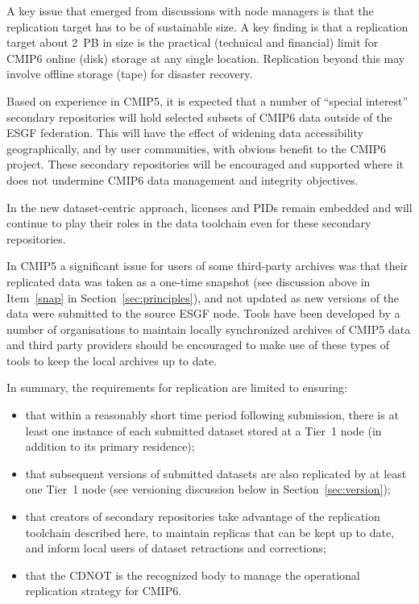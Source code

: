 \documentclass[gmd,manuscript]{copernicus}
\begin{document}
A key issue that emerged from discussions with node managers is that
the replication target has to be of sustainable size. A key finding is
that a replication target about 2~PB in size is the practical
(technical and financial) limit for CMIP6 online (disk) storage at any
single location. Replication beyond this may involve offline storage
(tape) for disaster recovery.

Based on experience in CMIP5, it is expected that a number of
``special interest'' secondary repositories will hold selected subsets
of CMIP6 data outside of the ESGF federation. This will have the
effect of widening data accessibility geographically, and by user
communities, with obvious benefit to the CMIP6 project. These
secondary repositories will be encouraged and supported where it does
not undermine CMIP6 data management and integrity objectives.

In the new dataset-centric approach, licenses and PIDs remain embedded
and will continue to play their roles in the data toolchain even for
these secondary repositories.

In CMIP5 a significant issue for users of some third-party archives
was that their replicated data was taken as a one-time snapshot (see
discussion above in Item~\ref{snap} in Section~\ref{sec:principles}),
and not updated as new versions of the data were submitted to the
source ESGF node. Tools have been developed by a number of
organisations to maintain locally synchronized archives of CMIP5 data
and third party providers should be encouraged to make use of these
types of tools to keep the local archives up to date.

In summary, the requirements for replication are limited to ensuring:

\begin{itemize}
\item that within a reasonably short time period following submission,
there is at least one instance of each submitted dataset
  stored at a Tier~1 node (in addition to its primary residence);
\item that subsequent versions of submitted datasets are also
  replicated by at least one Tier~1 node (see versioning discussion
  below in Section~\ref{sec:version});
\item that creators of secondary repositories take advantage of the
  replication toolchain described here, to maintain replicas that can
  be kept up to date, and inform local users of dataset retractions and
  corrections;
\item that the CDNOT is the recognized body to manage the operational
  replication strategy for CMIP6.
\end{itemize}
\end{document}
